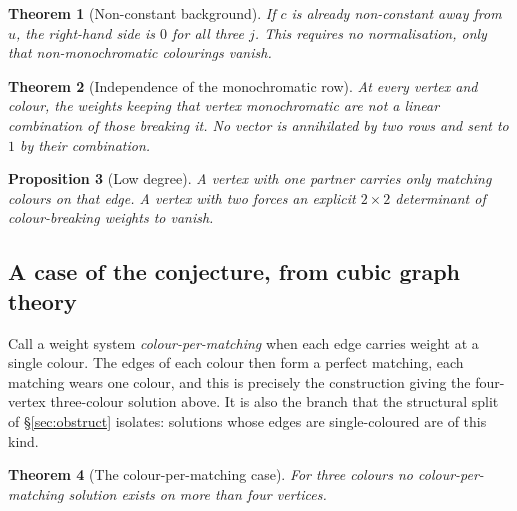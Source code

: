 \documentclass[11pt]{article}
\newtheorem{theorem}{Theorem}[section]
\newtheorem{proposition}[theorem]{Proposition}
\theoremstyle{definition}
\theoremstyle{remark}
\begin{document}
\begin{theorem}[Non-constant background]
If $c$ is already non-constant away from $u$, the right-hand side is $0$ for
\emph{all three} $j$. This requires no normalisation, only that non-monochromatic
colourings vanish.
\end{theorem}

\begin{theorem}[Independence of the monochromatic row]
At every vertex and colour, the weights keeping that vertex monochromatic are not a
linear combination of those breaking it. No vector is annihilated by two rows and
sent to $1$ by their combination.
\end{theorem}

\begin{proposition}[Low degree]
A vertex with one partner carries only matching colours on that edge. A vertex with
two forces an explicit $2\times2$ determinant of colour-breaking weights to vanish.
\end{proposition}

\subsection{A case of the conjecture, from cubic graph theory}

Call a weight system \emph{colour-per-matching} when each edge carries weight at a
single colour. The edges of each colour then form a perfect matching, each matching
wears one colour, and this is precisely the construction giving the four-vertex
three-colour solution above. It is also the branch that the structural split of
\S\ref{sec:obstruct} isolates: solutions whose edges are single-coloured are of this
kind.

\begin{theorem}[The colour-per-matching case]\label{thm:cpm}
For three colours no colour-per-matching solution exists on more than four
vertices.
\end{theorem}
\end{document}
